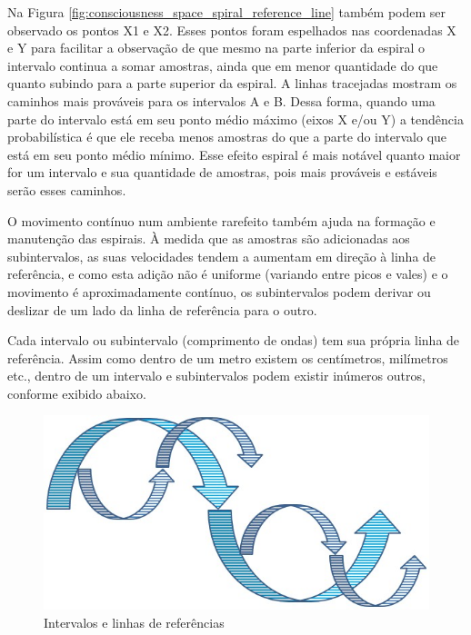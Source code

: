 Na Figura \ref{fig:consciousness_space_spiral_reference_line} também podem ser observado os pontos X1 e X2. Esses pontos foram espelhados nas coordenadas X e Y para facilitar a observação de que mesmo na parte inferior da espiral o intervalo continua a somar amostras, ainda que em menor quantidade do que quanto subindo para a parte superior da espiral. A linhas tracejadas mostram os caminhos mais prováveis para os intervalos A e B. Dessa forma, quando uma parte do intervalo está em seu ponto médio máximo (eixos X e/ou Y) a tendência probabilística é que ele receba menos amostras do que a parte do intervalo que está em seu ponto médio mínimo. Esse efeito espiral é mais notável quanto maior for um intervalo e sua quantidade de amostras, pois mais prováveis e estáveis serão esses caminhos.

O movimento contínuo num ambiente rarefeito também ajuda na formação e manutenção das espirais. À medida que as amostras são adicionadas aos subintervalos, as suas velocidades tendem a aumentam em direção à linha de referência, e como esta adição não é uniforme (variando entre picos e vales) e o movimento é aproximadamente contínuo, os subintervalos podem derivar ou deslizar de um lado da linha de referência para o outro.

Cada intervalo ou subintervalo (comprimento de ondas) tem sua própria linha de referência. Assim como dentro de um metro existem os centímetros, milímetros etc., dentro de um intervalo e subintervalos podem existir inúmeros outros, conforme exibido abaixo.
	\begin{figure}[H]
	\caption{Intervalos e linhas de referências}
	\label{fig:consciousness_space_spiral_underlines}
	\centering
	\includegraphics[scale=.5]{sections/images/consciousness_space_spiral_underlines.jpg}
	\end{figure}

